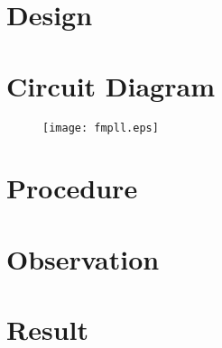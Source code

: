 \section*{Design}
\section*{Circuit Diagram}
\begin{figure}
\texttt{[image: fmpll.eps]}

\end{figure}

\section*{Procedure}
\section*{Observation}
\section*{Result}

